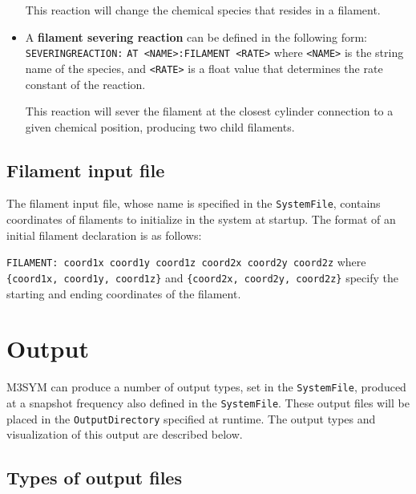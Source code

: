 \documentclass[11pt, oneside]{article}   	%
\begin{document}
\begin{itemize}
This reaction will change the chemical species that resides in a filament.

\item A \textbf{filament severing reaction} can be defined in the following form:\newline\newline
\texttt{SEVERINGREACTION:}\newline
\texttt{AT <NAME>:FILAMENT <RATE>}\newline\newline
where \texttt{<NAME>} is the string name of the species, and \texttt{<RATE>} is a float value that determines the rate constant of the reaction.

This reaction will sever the filament at the closest cylinder connection to a given chemical position, producing two child filaments.

\end{itemize}

\subsection{Filament input file}

The filament input file, whose name is specified in the \texttt{SystemFile}, contains coordinates of filaments to initialize in the system at startup. The format of an initial filament declaration is as follows:\newline

\texttt{FILAMENT: coord1x coord1y coord1z coord2x coord2y coord2z}\newline\newline
\noindent where \texttt{\{coord1x, coord1y, coord1z\}} and \texttt{\{coord2x, coord2y, coord2z\}} specify the starting and 
ending coordinates of the filament.

\section {Output}

M3SYM can produce a number of output types, set in the \texttt{SystemFile}, produced at a snapshot frequency also defined in the \texttt{SystemFile}. These output files will be placed in the \texttt{OutputDirectory} specified at runtime. The output types and visualization of this output are described below.

\subsection{Types of output files}
\end{document}
